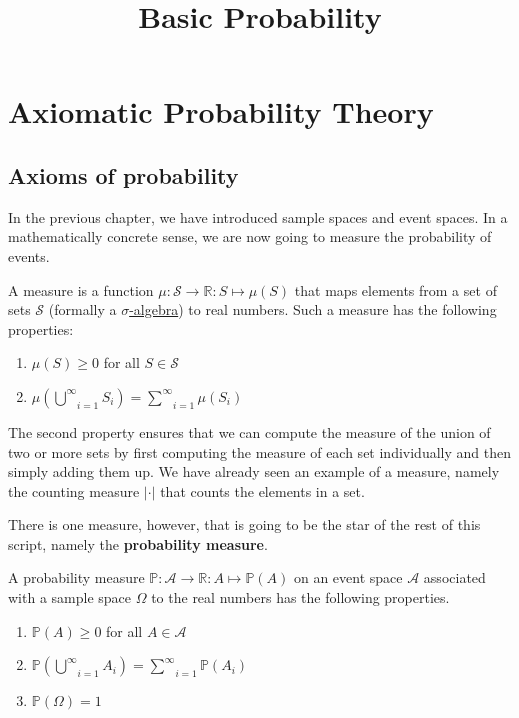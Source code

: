 \documentclass[a4paper,11pt,leqno]{report}
\title{Basic Probability}
\date{}
\begin{document}
\chapter{Axiomatic Probability Theory}

\section{Axioms of probability}
In the previous chapter, we have introduced sample spaces and event spaces. 
In a mathematically concrete sense, we are now going to measure the probability of events. 

\begin{Definition}
A measure is a function $ \mu: \mathcal{S} \rightarrow \mathbb{R} : S \mapsto \mu (S) $ that maps elements
from a set of sets $ \mathcal{S} $ (formally a \href{http://en.wikipedia.org/wiki/Sigma-algebra}
{$ \sigma $-algebra}) to real numbers. Such a measure has the following properties:
\begin{enumerate}
\item $ \mu(S) \geq 0 $ for all $ S \in \mathcal{S} $
\item $ \mu\left( \underset{i = 1}{\overset{\infty}{\bigcup}} S_{i} \right)
= \underset{i = 1}{\overset{\infty}{\sum}} \mu \left( S_{i} \right) $
\end{enumerate}
\end{Definition}

The second property ensures that we can compute the measure of the union of two or more sets by
first computing the measure of each set individually and then simply adding them up. We have already
seen an example of a measure, namely the counting measure $ |\cdot| $ that counts the elements in a set.

There is one measure, however, that is going to be the star of the rest of this script, namely 
the \textbf{probability measure}.

\begin{Definition}
A probability measure $ \mathbb{P}: \mathcal{A} \rightarrow \mathbb{R} : A \mapsto \mathbb{P}(A) $
on an event space $ \mathcal{A} $ associated with a sample space $ \Omega $ to the real numbers has the
following properties.
\begin{enumerate}
\item $ \mathbb{P}(A) \geq 0 $ for all $ A \in \mathcal{A} $
\item $ \mathbb{P}\left( \underset{i = 1}{\overset{\infty}{\bigcup}} A_{i} \right)
= \underset{i = 1}{\overset{\infty}{\sum}} \mathbb{P} \left( A_{i} \right) $ \label{union}
\item $ \mathbb{P}(\Omega) = 1 $ \label{unity}
\end{enumerate}
\end{Definition}
\end{document}
